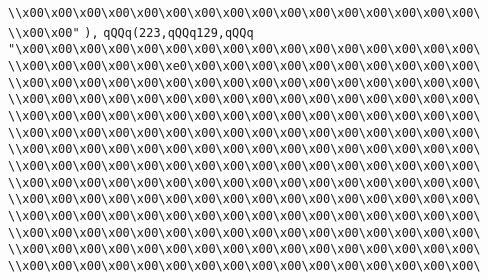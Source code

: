 \verb|\\x00\x00\x00\x00\x00\x00\x00\x00\x00\x00\x00\x00\x00\x00\x00\x00\|\newline
\verb|\\x00\x00"|\newline
\verb|),|\newline
\verb|qQQq(223,qQQq129,qQQq|\newline
\verb|"\x00\x00\x00\x00\x00\x00\x00\x00\x00\x00\x00\x00\x00\x00\x00\x00\|\newline
\verb|\\x00\x00\x00\x00\x00\xe0\x00\x00\x00\x00\x00\x00\x00\x00\x00\x00\|\newline
\verb|\\x00\x00\x00\x00\x00\x00\x00\x00\x00\x00\x00\x00\x00\x00\x00\x00\|\newline
\verb|\\x00\x00\x00\x00\x00\x00\x00\x00\x00\x00\x00\x00\x00\x00\x00\x00\|\newline
\verb|\\x00\x00\x00\x00\x00\x00\x00\x00\x00\x00\x00\x00\x00\x00\x00\x00\|\newline
\verb|\\x00\x00\x00\x00\x00\x00\x00\x00\x00\x00\x00\x00\x00\x00\x00\x00\|\newline
\verb|\\x00\x00\x00\x00\x00\x00\x00\x00\x00\x00\x00\x00\x00\x00\x00\x00\|\newline
\verb|\\x00\x00\x00\x00\x00\x00\x00\x00\x00\x00\x00\x00\x00\x00\x00\x00\|\newline
\verb|\\x00\x00\x00\x00\x00\x00\x00\x00\x00\x00\x00\x00\x00\x00\x00\x00\|\newline
\verb|\\x00\x00\x00\x00\x00\x00\x00\x00\x00\x00\x00\x00\x00\x00\x00\x00\|\newline
\verb|\\x00\x00\x00\x00\x00\x00\x00\x00\x00\x00\x00\x00\x00\x00\x00\x00\|\newline
\verb|\\x00\x00\x00\x00\x00\x00\x00\x00\x00\x00\x00\x00\x00\x00\x00\x00\|\newline
\verb|\\x00\x00\x00\x00\x00\x00\x00\x00\x00\x00\x00\x00\x00\x00\x00\x00\|\newline
\verb|\\x00\x00\x00\x00\x00\x00\x00\x00\x00\x00\x00\x00\x00\x00\x00\x00\|\newline
